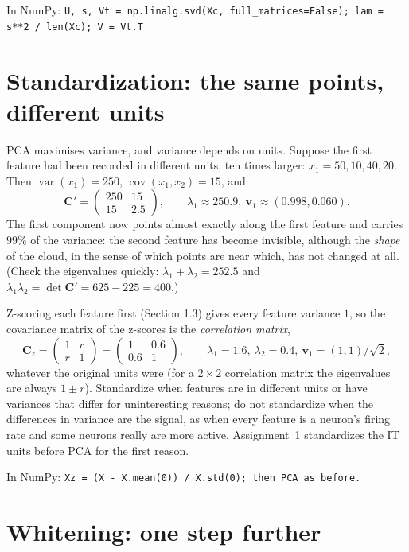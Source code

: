 \documentclass[11pt]{article}
\newcommand{\vv}{\bm{v}}
\newcommand{\mC}{\bm{C}}
\newcommand{\np}[1]{{\small\color{lightgray}In NumPy: \texttt{#1}}\par}
\begin{document}
\np{U, s, Vt = np.linalg.svd(Xc, full\_matrices=False); lam = s**2 / len(Xc); V = Vt.T}

\section{Standardization: the same points, different units}
\label{sec:standardize}

PCA maximises variance, and variance depends on units. Suppose the first feature had been
recorded in different units, ten times larger: $x_1 = 50, 10, 40, 20$. Then
$\operatorname{var}(x_1) = 250$, $\operatorname{cov}(x_1, x_2) = 15$, and
\[
\mC' = \begin{pmatrix} 250 & 15 \\ 15 & 2.5 \end{pmatrix}, \qquad
\lambda_1 \approx 250.9,\ \vv_1 \approx (0.998, 0.060) .
\]
The first component now points almost exactly along the first feature and carries $99\%$
of the variance: the second feature has become invisible, although the \emph{shape} of the
cloud, in the sense of which points are near which, has not changed at all. (Check the
eigenvalues quickly: $\lambda_1 + \lambda_2 = 252.5$ and $\lambda_1\lambda_2 = \det\mC' =
625 - 225 = 400$.)

Z-scoring each feature first (Section 1.3) gives every feature variance $1$, so the
covariance matrix of the z-scores is the \emph{correlation matrix},
\[
\mC_z = \begin{pmatrix} 1 & r \\ r & 1 \end{pmatrix} = \begin{pmatrix} 1 & 0.6 \\ 0.6 & 1\end{pmatrix},
\qquad \lambda_1 = 1.6,\ \lambda_2 = 0.4,\ \vv_1 = (1, 1)/\sqrt 2 ,
\]
whatever the original units were (for a $2\times2$ correlation matrix the eigenvalues are
always $1 \pm r$). Standardize when features are in different units or have variances that
differ for uninteresting reasons; do not standardize when the differences in variance are
the signal, as when every feature is a neuron's firing rate and some neurons really are
more active. Assignment~1 standardizes the IT units before PCA for the first reason.

\np{Xz = (X - X.mean(0)) / X.std(0); then PCA as before.}

\section{Whitening: one step further}
\end{document}
